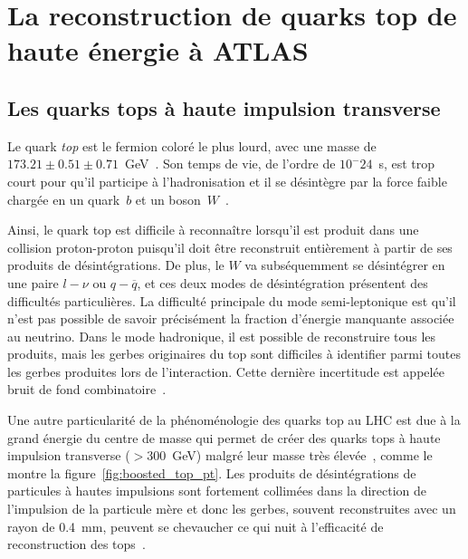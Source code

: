 \singlespacing{}
\chapter{La reconstruction de quarks top de haute énergie à ATLAS}
\label{sec:top}
\doublespacing{}

\section{Les quarks tops à haute impulsion transverse}
\label{sec:top:boosted}

Le quark \emph{top} est le fermion coloré le plus lourd, avec une
masse de $173.21\pm0.51\pm0.71$~GeV~\cite{olive_review_2014}. Son
temps de vie, de l'ordre de $10^-{24}$~s, est trop court pour qu'il
participe à l'hadronisation et il se désintègre par la force faible chargée
en un quark~$b$ et un boson~$W$~\cite{olive_top_2014}.

Ainsi, le quark top est difficile à reconnaître lorsqu'il est produit
dans une collision proton-proton puisqu'il doit être reconstruit
entièrement à partir de ses produits de désintégrations. De plus, le
$W$ va subséquemment se désintégrer en une paire $l-\nu$ ou
$q-\overline{q}$, et ces deux modes de désintégration présentent des
difficultés particulières. La difficulté principale du mode
semi-leptonique est qu'il n'est pas possible de savoir précisément la
fraction d'énergie manquante associée au neutrino. Dans le mode
hadronique, il est possible de reconstruire tous les produits, mais
les gerbes originaires du top sont difficiles à identifier parmi toutes
les gerbes produites lors de l'interaction. Cette dernière incertitude
est appelée bruit de fond combinatoire~\cite{bandyopadhyay_boosted_2011}.

Une autre particularité de la phénoménologie des quarks top au LHC est
due à la grand énergie du centre de masse qui permet de créer des
quarks tops à haute impulsion transverse ($>300$~GeV) malgré leur
masse très élevée~\cite{atlas_collaboration_measurement_2015}, comme
le montre la figure~\ref{fig:boosted_top_pt}.  Les produits de
désintégrations de particules à hautes impulsions sont fortement
collimées dans la direction de l'impulsion de la particule mère et donc
les gerbes, souvent reconstruites avec un rayon de 0.4~mm, peuvent se
chevaucher ce qui nuit à l'efficacité de reconstruction des
tops~\cite{_identification_2015}.

